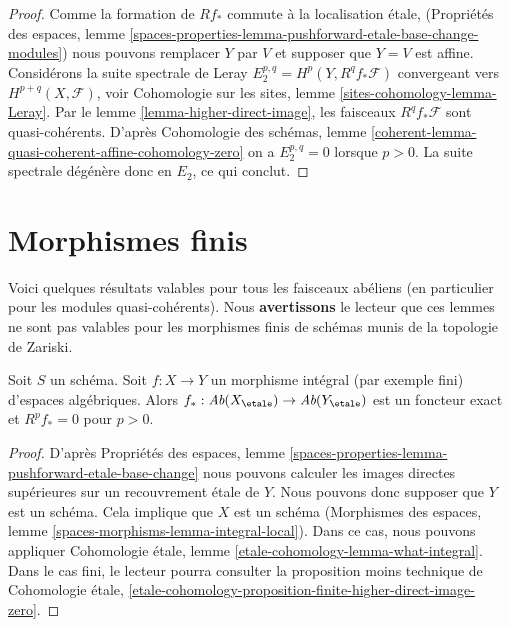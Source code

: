 \begin{proof}
Comme la formation de $Rf_*$ commute à la localisation étale,
(Propriétés des espaces, lemme
\ref{spaces-properties-lemma-pushforward-etale-base-change-modules})
nous pouvons remplacer $Y$ par $V$ et supposer que $Y = V$ est affine.
Considérons la suite spectrale de Leray
$E_2^{p, q} = H^p(Y, R^qf_*\mathcal{F})$
convergeant vers $H^{p + q}(X, \mathcal{F})$, voir
Cohomologie sur les sites, lemme \ref{sites-cohomology-lemma-Leray}.
Par le lemme \ref{lemma-higher-direct-image},
les faisceaux $R^qf_*\mathcal{F}$ sont quasi-cohérents. D'après
Cohomologie des schémas, lemme
\ref{coherent-lemma-quasi-coherent-affine-cohomology-zero}
on a $E_2^{p, q} = 0$ lorsque $p > 0$.
La suite spectrale dégénère donc en $E_2$, ce qui conclut.
\end{proof}




\section{Morphismes finis}
\label{section-finite-morphisms}

\noindent
Voici quelques résultats valables pour tous les faisceaux abéliens
(en particulier pour les modules quasi-cohérents).
Nous {\bf avertissons} le lecteur que ces lemmes ne sont pas valables pour
les morphismes finis de schémas munis de la topologie de Zariski.

\begin{lemma}
\label{lemma-finite-higher-direct-image-zero}
Soit $S$ un schéma. Soit $f : X \to Y$ un morphisme intégral (par exemple fini)
d'espaces algébriques. Alors
$f_* : \textit{Ab}(X_\etale) \to \textit{Ab}(Y_\etale)$
est un foncteur exact et $R^pf_* = 0$ pour $p > 0$.
\end{lemma}

\begin{proof}
D'après Propriétés des espaces, lemme
\ref{spaces-properties-lemma-pushforward-etale-base-change}
nous pouvons calculer les images directes supérieures sur un recouvrement étale de $Y$.
Nous pouvons donc supposer que $Y$ est un schéma.
Cela implique que $X$ est un schéma (Morphismes des espaces, lemme
\ref{spaces-morphisms-lemma-integral-local}).
Dans ce cas, nous pouvons appliquer
Cohomologie étale, lemme \ref{etale-cohomology-lemma-what-integral}.
Dans le cas fini, le lecteur pourra consulter la
proposition moins technique de Cohomologie étale,
\ref{etale-cohomology-proposition-finite-higher-direct-image-zero}.
\end{proof}

